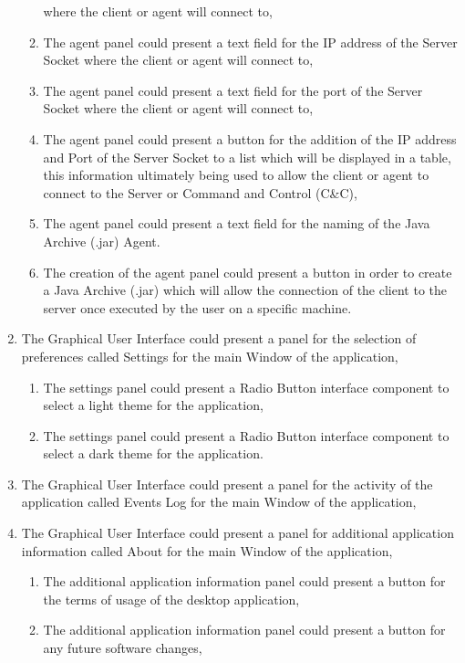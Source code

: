\begin{enumerate}
\begin{enumerate}
        where the client or agent will connect to,
        \item The agent panel could present a text field for the IP address of the Server Socket
        where the client or agent will connect to,
        \item The agent panel could present a text field for the port of the Server Socket
        where the client or agent will connect to,
        \item The agent panel could present a button for the addition of the IP address and Port
        of the Server Socket to a list which will be displayed in a table, this information ultimately being
        used to allow the client or agent to connect to the Server or Command and Control (C\&C),
        \item The agent panel could present a text field for the naming of the Java Archive
        (.jar) Agent.
        \item The creation of the agent panel could present a button in order to create a Java Archive (.jar)
        which will allow the connection of the client to the server once executed by the user on a specific
        machine.
    \end{enumerate}
    \item The Graphical User Interface could present a panel for the selection of preferences called Settings
    for the main Window of the application,
    \begin{enumerate}
        \item The settings panel could present a Radio Button interface component to select a light theme for the
        application,
        \item The settings panel could present a Radio Button interface component to select a dark theme for the
        application.
    \end{enumerate}
    \item The Graphical User Interface could present a panel for the activity of the application called Events
    Log for the main Window of the application,
    \item The Graphical User Interface could present a panel for additional application information called About
    for the main Window of the application,
    \begin{enumerate}
        \item The additional application information panel could present a button for the terms of usage of the
        desktop application,
        \item The additional application information panel could present a button for any future software changes,

\end{enumerate}
\end{enumerate}
